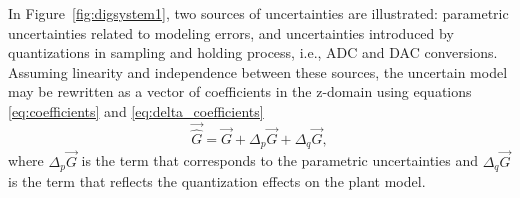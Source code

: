\documentclass{sig-alternate-05-2015}
\newcommand{\red}[1]{{\color{red}#1}}
\begin{document}
%
In Figure~\ref{fig:digsystem1}, two sources of uncertainties are
illustrated: parametric uncertainties related to modeling errors, and
uncertainties introduced by quantizations in sampling and holding process,
i.e., ADC and DAC conversions.  Assuming linearity and independence between
these sources, the uncertain model may be rewritten as a vector of coefficients in the z-domain using equations \ref{eq:coefficients} and \ref{eq:delta_coefficients}
%
\begin{equation}
\label{eq:complete_unc_model}
\vec{\hat{G}}=\vec{G}+\Delta_p \vec{G}+\Delta_q \vec{G},
\end{equation}
%
where $\Delta_p \vec{G}$ is the term that corresponds to the parametric
uncertainties and $\Delta_q \vec{G}$ is the term that reflects the
quantization effects on the plant model.

\end{document}

